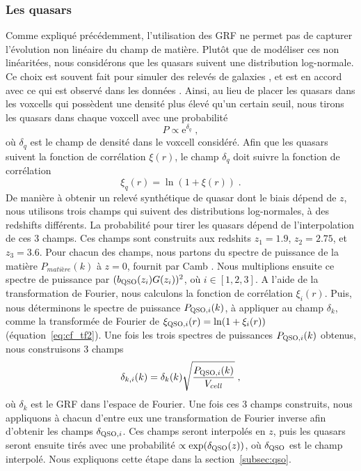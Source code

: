 \documentclass[11pt, twoside, a4paper, openright]{report}
\begin{document}
\subsubsection{Les quasars}
Comme expliqué précédemment, l'utilisation des GRF ne permet pas de capturer l'évolution non linéaire du champ de matière. Plutôt que de modéliser ces non linéaritées, nous considérons que les quasars suivent une distribution log-normale.
Ce choix est souvent fait pour simuler des relevés de galaxies \citep{agrawal_generating_2017}, et est en accord avec ce qui est observé dans les données \citep{Clerkin2016}.
Ainsi, au lieu de placer les quasars dans les voxcells qui possèdent une densité plus élevé qu'un certain seuil, nous tirons les quasars dans chaque voxcell avec une probabilité
\begin{equation}
  P \propto \mathrm{e}^{\delta_q} \; ,
\end{equation}
où $\delta_q$ est le champ de densité dans le voxcell considéré.
Afin que les quasars suivent la fonction de corrélation $\xi(r)$, le champ $\delta_q$ doit suivre la fonction de corrélation
\begin{equation}
  \label{eq:lognormal}
  \xi_q(r) = \ln(1+\xi(r)) \; .
\end{equation}
De manière à obtenir un relevé synthétique de quasar dont le biais dépend de $z$, nous utilisons trois champs qui suivent des distributions log-normales, à des redshifts différents. La probabilité pour tirer les quasars dépend de l'interpolation de ces 3 champs. Ces champs sont construits aux redshits $z_1 = \num{1.9}$, $z_2 = \num{2.75}$, et $z_3 = \num{3.6}$. Pour chacun des champs, nous partons du spectre de puissance de la matière $P_{matière}(k)$ à $z=0$, fournit par Camb \citep{Lewis1999}. Nous multiplions ensuite ce spectre de puissance par $(b_{\textsc{QSO}}(z_i) G(z_i))^2$, où $i \in [1, 2, 3]$. A l'aide de la transformation de Fourier, nous calculons la fonction de corrélation $\xi_{i}(r)$. Puis, nous déterminons le spectre de puissance $P_{\textsc{QSO},i}(k)$, à appliquer au champ $\delta_k$, comme la transformée de Fourier de $\xi_{\textsc{QSO},i}(r) = \ln(1+\xi_i(r))$ (équation~\ref{eq:cf_tf2}).
Une fois les trois spectres de puissances $P_{\textsc{QSO},i}(k)$ obtenus, nous construisons 3 champs
\begin{equation}
  \delta_{k,i}(k)  = \delta_k(k) \sqrt{\frac{P_{\textsc{QSO},i}(k)}{V_{cell}}} \; ,
\end{equation}
où $\delta_k$ est le GRF dans l'espace de Fourier. Une fois ces 3 champs construits, nous appliquons à chacun d'entre eux une transformation de Fourier inverse afin d'obtenir les champs $\delta_{\textsc{QSO}, i}$. Ces champs seront interpolés en $z$, puis les quasars seront ensuite tirés avec une probabilité $\propto \exp(\delta_{\textsc{QSO}}(z))$, où $\delta_{\textsc{QSO}}$ est le champ interpolé. Nous expliquons cette étape dans la section~\ref{subsec:qso}.
\end{document}
